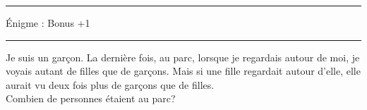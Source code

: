 \documentclass[11pt,a4paper]{article}
\newcommand{\cadreblanc}[1]{%
\medskip\framebox[\linewidth][c]{%
\rule{0mm}{#1mm}}\par
\medskip}
\begin{document}
\vfill 

\hrule 
\begin{center}
   \Large{Énigme : Bonus +1} \\[5mm]
\end{center}



\hrule

  Je suis un garçon. La dernière fois, au parc, lorsque je regardais autour de moi, je voyais autant de filles que de garçons. Mais si une fille regardait autour d'elle, elle aurait vu deux fois plus de garçons que de filles. \\[3mm]
  Combien de personnes étaient au parc?

  \cadreblanc{35}

  \vfill 
  
\end{document}
